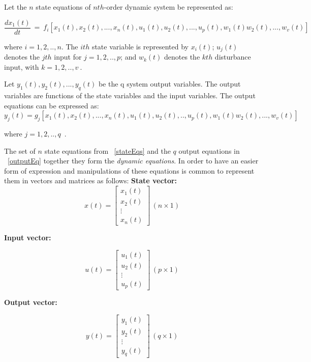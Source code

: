 Let the $n$ state equations of $nth$-order dynamic system be represented as:

\begin{equation}
	\frac{dx_1 (t)}{dt} ~ = ~ f_i [x_1(t),x_2(t),...,x_n(t), u_1(t),u_2(t),...,u_p(t),w_1(t)w_2(t),...,w_v(t)]
	\label{stateEqs}
\end{equation}

 where $i=1,2,..,n$. The $ith$ state variable is represented by $x_i(t)$; $u_j(t)$ denotes the $jth$ input for $j=1,2,..,p$; and $w_k(t)$ denotes the $kth$ disturbance input, with $k=1,2,..,v~$.\smallskip
 
 Let $y_1(t),y_2(t),...,y_q(t) $ be the q system output variables. The output variables are functions of the state variables  and the input variables. The output equations can be expressed as:
 \begin{equation}
 	y_j(t)=g_j[x_1(t),x_2(t),...,x_n(t),u_1(t),u_2(t),..,u_p(t),w_1(t)w_2(t),...,w_v(t)]
 \label{outputEq}
 \end{equation}
 
 where $j=1,2,..,q$~.
 \smallskip
 
 The set of $n$ state equations from ~\ref{stateEqs} and the $q$ output equations in ~\ref{outputEq} together they form the \textit{dynamic equations}. In order to have an easier form of expression and manipulations of these equations is common to represent them in vectors and matrices as follows: \smallskip
 \textbf{State vector:}
 \begin{equation}
 x(t)=
 \left[
 	\begin{matrix}
 	x_1(t)\\
 	x_2(t)\\
 	\vdots\\
 	x_n(t)
 	\end{matrix}
 	\right] \, (n\times 1)
 \end{equation}
 
\textbf{ Input vector:}
 
  \begin{equation}
 u(t)=
 \left[
 \begin{matrix}
 u_1(t)\\
 u_2(t)\\
 \vdots\\
 u_p(t)
 \end{matrix}
 \right] \, (p\times 1)
 \end{equation}
 
 \textbf{ Output vector:}
 
   \begin{equation}
y(t)=
 \left[
 \begin{matrix}
 y_1(t)\\
 y_2(t)\\
 \vdots\\
 y_q(t)
 \end{matrix}
 \right] \, (q\times 1)
 \end{equation}
 
